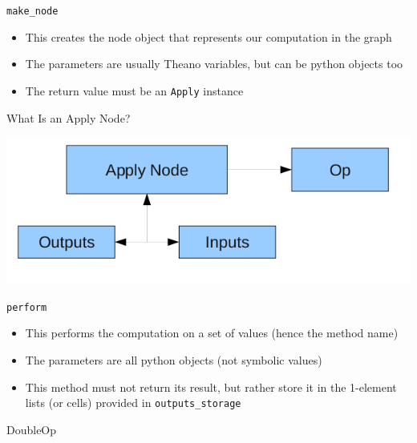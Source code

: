 \documentclass[utf8x]{beamer}
\newcommand{\code}[1]{\lstinline[emph={[2]}]|#1|}
\begin{document}
\begin{frame}{\code{make_node}}

\begin{itemize}
\item This creates the node object that represents our computation in the graph
\item The parameters are usually Theano variables, but can be python objects too
\item The return value must be an \code{Apply} instance
\end{itemize}
\end{frame}

\begin{frame}{What Is an Apply Node?}
\begin{center}
\includegraphics[width=\textwidth]{apply_node}
\end{center}
\end{frame}

\begin{frame}{\code{perform}}

\begin{itemize}
\item This performs the computation on a set of values (hence the method name)
\item The parameters are all python objects (not symbolic values)
\item This method must not return its result, but rather store it in the 1-element lists (or cells) provided in \code{outputs_storage}
\end{itemize}
\end{frame}

\begin{frame}{DoubleOp}

\end{frame}

\end{document}
